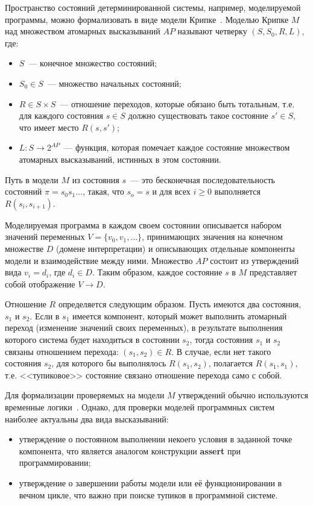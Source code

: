 \documentclass[12pt,a4paper,article]{bpm2}
\begin{document}
Пространство состояний детерминированной системы, например, моделируемой программы, можно формализовать в виде модели Крипке~\cite{Clarke}.
Моделью Крипке $M$ над множеством атомарных высказываний $AP$
называют четверку $(S, S_0, R, L)$, где:

\begin{itemize}
\item $S$~--- конечное множество состояний;
\item $S_0 \in S$~--- множество начальных состояний;
\item $R \in S \times S$~--- отношение переходов, которые обязано быть тотальным, т.е. для каждого состояния $s \in S$
  должно существовать такое состояние $s' \in S$, что имеет место $R(s, s')$;
\item $L\colon S \rightarrow 2^{AP}$~--- функция, которая помечает каждое состояние множеством  атомарных высказываний, истинных в этом состоянии.
\end{itemize}

Путь в модели $M$ из состояния $s$~--- это бесконечная последовательность состояний $\pi = s_0 s_1 \ldots$, такая, что
$s_o = s$ и для всех $i \geq 0$ выполняется $R(s_i, s_{i+1})$.

Моделируемая программа в каждом своем состоянии описывается набором значений переменных $V = \{v_0, v_1, \ldots\}$, принимающих значения на конечном множестве $D$ (домене интерпретации) и описывающих отдельные компоненты модели и взаимодействие между ними.
Множество $AP$ состоит из утверждений вида $v_i = d_i$, где $d_i \in D$.
Таким образом, каждое состояние $s$ в $M$ представляет собой отображение $V \rightarrow D$.

Отношение $R$ определяется следующим образом. Пусть имеются два состояния, $s_1$ и $s_2$. Если в $s_1$ имеется
компонент, который может выполнить атомарный переход (изменение значений своих переменных), в результате выполнения
которого система будет находиться в состоянии $s_2$, тогда состояния $s_1$ и $s_2$ связаны отношением перехода: $(s_1,
s_2) \in R$. В случае, если нет такого состояния $s_2$, для которого бы выполнялось $R(s_1, s_2)$, полагается $R(s_1,
s_1)$, т.е. <<тупиковое>> состояние связано отношение перехода само с собой.

Для формализации проверяемых на модели $M$ утверждений обычно используются временные логики~\cite{Clarke}.
Однако, для проверки моделей программных систем наиболее актуальны два вида высказываний:
\begin{itemize}
\item утверждение о постоянном выполнении некоего условия в заданной точке компонента, что является аналогом конструкции \textbf{assert} при программировании;
\item утверждение о завершении работы модели или её функционировании в вечном цикле, что важно при поиске тупиков в программной системе.
\end{itemize}
\end{document}
